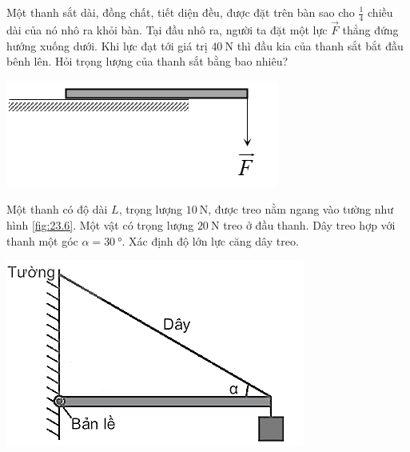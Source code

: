 \begin{ex}
	Một thanh sắt dài, đồng chất, tiết diện đều, được đặt trên bàn sao cho $\frac{1}{4}$ chiều dài của nó nhô ra khỏi bàn. Tại đầu nhô ra, người ta đặt một lực $\vec F$ thẳng đứng hướng xuống dưới. Khi lực đạt tới giá trị $\SI{40}{\newton}$ thì đầu kia của thanh sắt bắt đầu bênh lên. Hỏi trọng lượng của thanh sắt bằng bao nhiêu?
	\begin{center}
		\includegraphics[width=0.4\linewidth]{../figs/VN10-2022-PH-TP023-P-10}
	\end{center}
\end{ex}
\begin{ex}
Một thanh có độ dài $L$, trọng lượng $\SI{10}{\newton}$, được treo nằm ngang vào tường như hình \ref{fig:23.6}. Một vật có trọng lượng $\SI{20}{\newton}$ treo ở đầu thanh. Dây treo hợp với thanh một góc $\alpha=\SI{30}{\degree}$. Xác định độ lớn lực căng dây treo.
\begin{center}
	\includegraphics[width=0.4\linewidth]{../figs/VN10-2022-PH-TP023-P-6}
	\label{fig:23.6}
\end{center}	
\end{ex}
